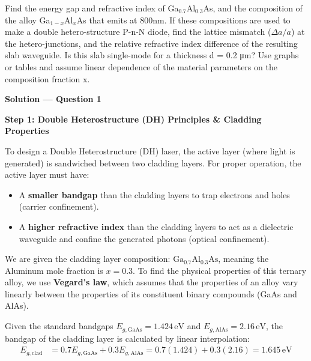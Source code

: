 
\begin{question}[Question 1]
Find the energy gap and refractive index of Ga$_{0.7}$Al$_{0.3}$As, and the composition of the alloy Ga$_{1-x}$Al$_x$As that emits at 800nm. If these compositions are used to make a double hetero-structure P-n-N diode, find the lattice mismatch ($\Delta a/a$) at the hetero-junctions, and the relative refractive index difference of the resulting slab waveguide. Is this slab single-mode for a thickness d = 0.2 \si{\micro\meter}? Use graphs or tables and assume linear dependence of the material parameters on the composition fraction x.
\end{question}

\textbf{\large Solution --- Question 1}

\textbf{Step 1: Double Heterostructure (DH) Principles \& Cladding Properties}

To design a Double Heterostructure (DH) laser, the active layer (where light is generated) is sandwiched between two cladding layers. For proper operation, the active layer must have:
\begin{itemize}
    \item A \textbf{smaller bandgap} than the cladding layers to trap electrons and holes (carrier confinement).
    \item A \textbf{higher refractive index} than the cladding layers to act as a dielectric waveguide and confine the generated photons (optical confinement).
\end{itemize}

We are given the cladding layer composition: $\text{Ga}_{0.7}\text{Al}_{0.3}\text{As}$, meaning the Aluminum mole fraction is $x = 0.3$. 
To find the physical properties of this ternary alloy, we use \textbf{Vegard's law}, which assumes that the properties of an alloy vary linearly between the properties of its constituent binary compounds (GaAs and AlAs). 

Given the standard bandgaps $E_{g,\text{GaAs}} = 1.424\,\text{eV}$ and $E_{g,\text{AlAs}} = 2.16\,\text{eV}$, the bandgap of the cladding layer is calculated by linear interpolation:
\begin{align*}
  E_{g,\text{clad}} &= 0.7 E_{g,\text{GaAs}} + 0.3 E_{g,\text{AlAs}} = 0.7(1.424) + 0.3(2.16) = 1.645\,\text{eV}
\end{align*}

